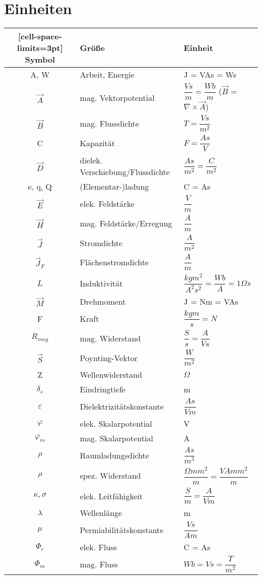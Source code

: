 \section{Einheiten} \label{sec:Einheiten}
\begin{NiceTabular}{c|l|l}[cell-space-limits=3pt]
    \hline
    Symbol & Größe & Einheit\\
    \hline 
    A, W & Arbeit, Energie & J = VAs = Ws\\
    $\vec{A}$ & mag. Vektorpotential & $\dfrac{Vs}{m} = \dfrac{Wb}{m}$ ($\vec{B}$ = $\nabla \times \vec{A}$)\\
    $\vec{B}$ & mag. Flussdichte & $T = \dfrac{Vs}{m^2}$\\
    C & Kapazität & $F = \dfrac{As}{V}$\\
    $\vec{D}$ & dielek. Verschiebung/Flussdichte & $\dfrac{As}{m^2} = \dfrac{C}{m^2}$\\
    e, q, Q & (Elementar-)ladung & C = As\\
    $\vec{E}$ & elek. Feldstärke & $\dfrac{V}{m}$ \\
    $\vec{H}$ & mag. Feldstärke/Erregung & $\dfrac{A}{m}$\\
    $\vec{J}$ & Stromdichte & $\dfrac{A}{m^2}$\\
    $\vec{J}_F$ & Flächenstromdichte & $\dfrac{A}{m}$\\
    $L$ & Induktivität & $\dfrac{kgm^2}{A^2s^2} = \dfrac{Wb}{A} = 1 \Omega s$ \\
    $\vec{M}$ & Drehmoment & J = Nm = VAs\\
    F & Kraft & $\dfrac{kgm}{s} = N$\\
    $R_{mag}$ & mag. Widerstand & $\dfrac{S}{s} = \dfrac{A}{Vs}$\\
    $\vec{S}$ & Poynting-Vektor & $\dfrac{W}{m^2}$\\
    Z & Wellenwiderstand & $\Omega$\\
    $\delta_s$ & Eindringtiefe & m \\
    $\varepsilon$ & Dielektrizitätskonstante & $\dfrac{As}{Vm}$\\
    $\varphi$ & elek. Skalarpotential & V \\
    $\varphi_m$ & mag. Skalarpotential & A \\
    $\rho$ & Raumladungsdichte & $\dfrac{As}{m^3}$\\
    $\rho$ & spez. Widerstand & $\dfrac{\Omega mm^2}{m} = \dfrac{VA mm^2}{m}$\\
    $\kappa, \sigma$ & elek. Leitfähigkeit & $\dfrac{S}{m} = \dfrac{A}{Vm}$\\
    $\lambda$ & Wellenlänge & m\\
    $\mu$ & Permiabilitätskonstante & $\dfrac{Vs}{Am}$\\
    $\Phi_e$ & elek. Fluss & C = As\\
    $\Phi_m$ & mag. Fluss & $Wb = Vs = \dfrac{T}{m^2}$\\

    \hline
\end{NiceTabular}
    